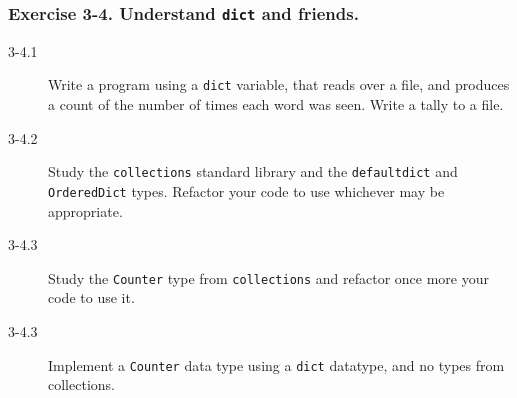 \documentclass{beamer} %
\begin{document}
\begin{frame}

\frametitle{Exercise 3-4. Understand \texttt{dict} and friends.}

\begin{description}
  \item[3-4.1] Write a program using a \texttt{dict} variable, that reads over a file, and produces a count of the number of times each word was seen. Write a tally to a file.
  \item[3-4.2] Study the \texttt{collections} standard library and the \texttt{defaultdict} and \texttt{OrderedDict} types. Refactor your code to use whichever may be appropriate.
  \item[3-4.3] Study the \texttt{Counter} type from \texttt{collections} and refactor once more your code to use it. 
  \item[3-4.3] Implement a \texttt{Counter} data type using a \texttt{dict} datatype, and no types from collections.
\end{description}

\end{frame}




\end{document}
